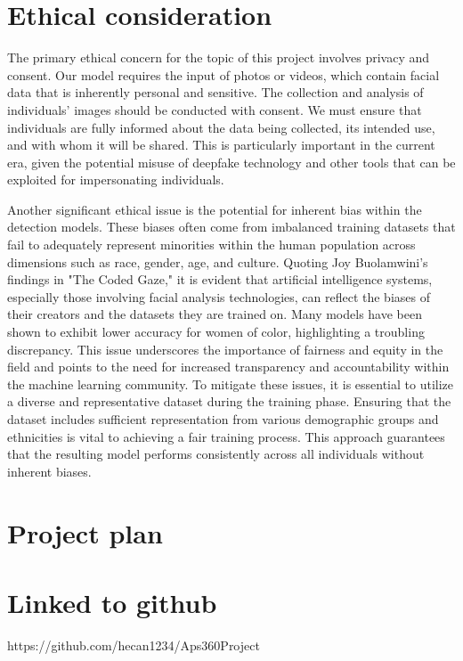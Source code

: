 \documentclass{article} %
\begin{document}
\section{Ethical consideration}
The primary ethical concern for the topic of this project involves privacy and consent. Our model requires the input of photos or videos, which contain facial data that is inherently personal and sensitive. The collection and analysis of individuals’ images should be conducted with consent. We must ensure that individuals are fully informed about the data being collected, its intended use, and with whom it will be shared. This is particularly important in the current era, given the potential misuse of deepfake technology and other tools that can be exploited for impersonating individuals.

Another significant ethical issue is the potential for inherent bias within the detection models. These biases often come from imbalanced training datasets that fail to adequately represent minorities within the human population across dimensions such as race, gender, age, and culture. Quoting Joy Buolamwini’s findings in "The Coded Gaze," it is evident that artificial intelligence systems, especially those involving facial analysis technologies, can reflect the biases of their creators and the datasets they are trained on. Many models have been shown to exhibit lower accuracy for women of color, highlighting a troubling discrepancy. This issue underscores the importance of fairness and equity in the field and points to the need for increased transparency and accountability within the machine learning community. To mitigate these issues, it is essential to utilize a diverse and representative dataset during the training phase. Ensuring that the dataset includes sufficient representation from various demographic groups and ethnicities is vital to achieving a fair training process. This approach guarantees that the resulting model performs consistently across all individuals without inherent biases.

\section{Project plan }



\section{Linked to github}
https://github.com/hecan1234/Aps360Project
\end{document}
